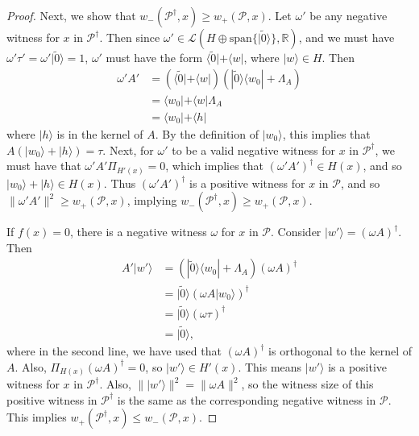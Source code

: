 \documentclass[cleveref, autoref, thm-restate,11pt]{article}
\theoremstyle{definition}
\newcommand{\sop}[1]{{\mathcal #1}}
\newcommand{\ket}[1]{|#1\rangle}
\newcommand{\bra}[1]{\langle#1|}
\newcommand{\ketbra}[2]{|{#1}\rangle\!\langle{#2}|}
\renewcommand{\wp}[2]{{w_+({#1},{#2})}}
\newcommand{\wm}[2]{{w_-({#1},{#2})}}
\begin{document}
\begin{proof}
Next, we show that $\wm{\sop P^\dagger}{x}\geq \wp{\sop P}{x}$. Let $\omega'$ be 
any negative witness for $x$ in $\sop P^\dagger$. Then since $\omega'\in \sop L(H\oplus\textrm{span}\{\ket{\tilde{0}}\},\mathbb{R})$, and we must have $\omega'\tau'=\omega'\ket{\tilde{0}}=1$,
$\omega'$ must have the form $\bra{\tilde{0}}+\bra{w}$, where $\ket{w}\in H$. Then
\begin{align}
\omega' A'&=(\bra{\tilde{0}}+\bra{w})(\ketbra{\tilde{0}}{w_0}+\Lambda_A)\\
&=\bra{w_0}+\bra{w}\Lambda_A\\
&=\bra{w_0}+\bra{h}
\end{align}
where $\ket{h}$ is in the kernel of $A$. By the definition of $\ket{w_0}$, 
this implies that $A(\ket{w_0}+\ket{h})=\tau$. 
Next, for $\omega'$ to be a valid negative witness 
for $x$ in $\sop P^\dagger$, we must have that $\omega' A'\Pi_{H'(x)}=0$, which implies
that $(\omega' A')^\dagger\in H(x)$, and so $\ket{w_0}+\ket{h}\in H(x)$. Thus
$(\omega' A')^\dagger$ is a positive witness for $x$ in $\sop P$, and so $\|\omega'A'\|^2\geq \wp{\sop P}{x}$, implying 
$\wm{\sop P^\dagger}{x}\geq \wp{\sop P}{x}$.

If $f(x)=0$, there is a negative witness $\omega$ for $x$ in $\sop P$. Consider
$\ket{w'}=(\omega A)^\dagger$. Then
\begin{align}
A'\ket{w'}&=(\ketbra{\tilde{0}}{w_0}+\Lambda_A)(\omega A)^\dagger\\
&=\ket{\tilde{0}}(\omega A\ket{w_0})^\dagger\\
&=\ket{\tilde{0}}(\omega\tau)^\dagger\\
&=\ket{\tilde{0}},
\end{align}
where in the second line, we have used that $(\omega A)^\dagger$ is orthogonal to
the kernel of $A.$ Also, $\Pi_{H(x)}(\omega A)^\dagger=0$, so $\ket{w'}\in
H'(x)$. This means $\ket{w'}$ is a positive witness for $x$ in $\sop P^\dagger.$
Also, $\|\ket{w'}\|^2=\|\omega A\|^2$, so the witness size of this positive
witness in $\sop P^\dagger$ is the same as the corresponding negative
witness in $\sop P.$ This implies $\wp{\sop P^\dagger}{x}\leq \wm{\sop P}{x}.$


\end{proof}
\end{document}
